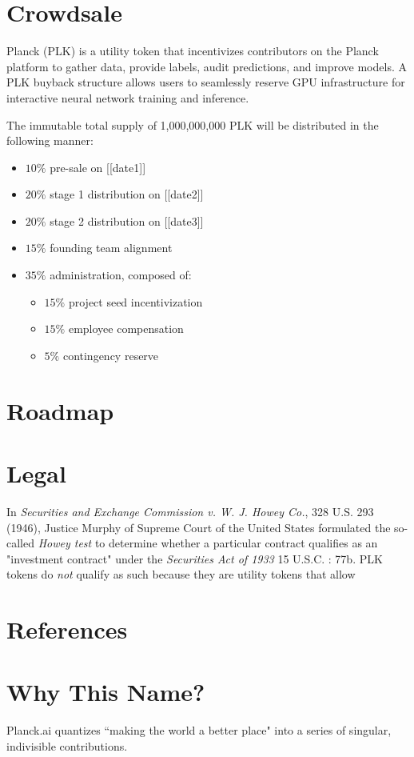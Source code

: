 \documentclass[12pt]{article}
\begin{document}
\section{Crowdsale}
Planck (PLK) is a utility token that incentivizes contributors on the Planck platform to gather data, provide labels, audit predictions, and improve models.  A PLK buyback structure allows users to seamlessly reserve GPU infrastructure for interactive neural network training and inference.


The immutable total supply of 1,000,000,000 PLK will be distributed in the following manner:
\begin{itemize}
\item{$10\%$ pre-sale on [[date1]]}
\item{$20\%$ stage 1 distribution on [[date2]]}
\item{$20\%$ stage 2 distribution on [[date3]]}
\item{$15\%$ founding team alignment}
\item{$35\%$ administration, composed of:}
\begin{itemize}
\item{$15\%$ project seed incentivization}
\item{$15\%$ employee compensation}
\item{$5\%$ contingency reserve}
\end{itemize}
\end{itemize}

\section{Roadmap}

\section{Legal}
In \emph{Securities and Exchange Commission v. W. J. Howey Co.}, 328 U.S. 293 (1946), Justice Murphy of Supreme Court of the United States formulated the so-called \emph{Howey test} to determine whether a particular contract qualifies as an "investment contract" under the \emph{Securities Act of 1933} 15 U.S.C. : 77b.  PLK tokens do \emph{not} qualify as such because they are utility tokens that allow 

\section{References}

\section{Why This Name?}
Planck.ai quantizes ``making the world a better place" into a series of singular, indivisible contributions.
\end{document}
